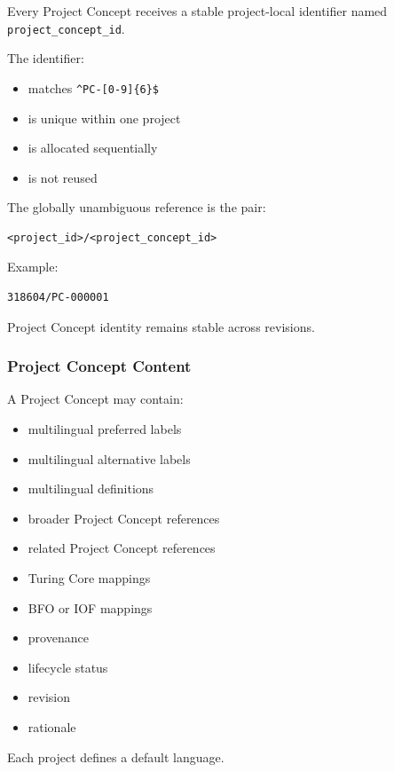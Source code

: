 Every Project Concept receives a stable project-local identifier named \texttt{project\_concept\_id}.

The identifier:

\begin{itemize}
\tightlist
\item
  matches \texttt{\^{}PC-{[}0-9{]}\{6\}\$}
\item
  is unique within one project
\item
  is allocated sequentially
\item
  is not reused
\end{itemize}

The globally unambiguous reference is the pair:

\begin{verbatim}
<project_id>/<project_concept_id>
\end{verbatim}

Example:

\begin{verbatim}
318604/PC-000001
\end{verbatim}

Project Concept identity remains stable across revisions.

\hypertarget{project-concept-content}{%
\subsubsection{Project Concept Content}\label{project-concept-content}}

A Project Concept may contain:

\begin{itemize}
\tightlist
\item
  multilingual preferred labels
\item
  multilingual alternative labels
\item
  multilingual definitions
\item
  broader Project Concept references
\item
  related Project Concept references
\item
  Turing Core mappings
\item
  BFO or IOF mappings
\item
  provenance
\item
  lifecycle status
\item
  revision
\item
  rationale
\end{itemize}

Each project defines a default language.

